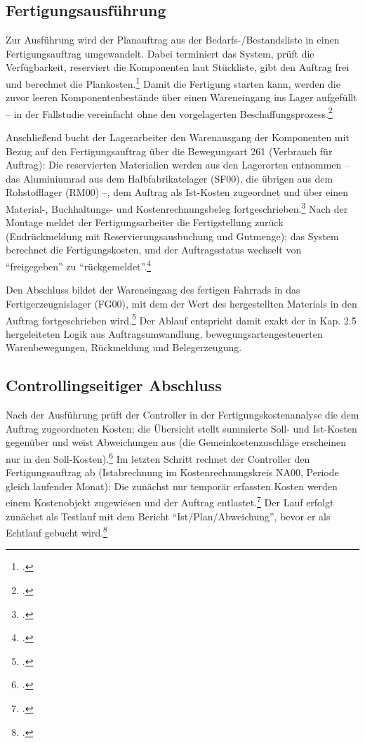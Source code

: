 \subsection{Fertigungsausführung}
Zur Ausführung wird der Planauftrag aus der Bedarfs-/Bestandsliste in einen Fertigungsauftrag umgewandelt. Dabei terminiert das System, prüft die Verfügbarkeit, reserviert die Komponenten laut Stückliste, gibt den Auftrag frei und berechnet die Plankosten.\footcite[Vgl.][S. 28 f.]{Boldau.2023} Damit die Fertigung starten kann, werden die zuvor leeren Komponentenbestände über einen Wareneingang ins Lager aufgefüllt -- in der Fallstudie vereinfacht ohne den vorgelagerten Beschaffungsprozess.\footcite[Vgl.][S. 31]{Boldau.2023}

Anschließend bucht der Lagerarbeiter den Warenausgang der Komponenten mit Bezug auf den Fertigungsauftrag über die Bewegungsart 261 (Verbrauch für Auftrag): Die reservierten Materialien werden aus den Lagerorten entnommen -- das Aluminiumrad aus dem Halbfabrikatelager (SF00), die übrigen aus dem Rohstofflager (RM00) --, dem Auftrag als Ist-Kosten zugeordnet und über einen Material-, Buchhaltungs- und Kostenrechnungsbeleg fortgeschrieben.\footcite[Vgl.][S. 34 f.]{Boldau.2023} Nach der Montage meldet der Fertigungsarbeiter die Fertigstellung zurück (Endrückmeldung mit Reservierungsausbuchung und Gutmenge); das System berechnet die Fertigungskosten, und der Auftragsstatus wechselt von \enquote{freigegeben} zu \enquote{rückgemeldet}.\footcite[Vgl.][S. 40 ff.]{Boldau.2023}

Den Abschluss bildet der Wareneingang des fertigen Fahrrads in das Fertigerzeugnislager (FG00), mit dem der Wert des hergestellten Materials in den Auftrag fortgeschrieben wird.\footcite[Vgl.][S. 44 f.]{Boldau.2023} Der Ablauf entspricht damit exakt der in Kap. 2.5 hergeleiteten Logik aus Auftragsumwandlung, bewegungsartengesteuerten Warenbewegungen, Rückmeldung und Belegerzeugung.

\subsection{Controllingseitiger Abschluss}
Nach der Ausführung prüft der Controller in der Fertigungskostenanalyse die dem Auftrag zugeordneten Kosten; die Übersicht stellt summierte Soll- und Ist-Kosten gegenüber und weist Abweichungen aus (die Gemeinkostenzuschläge erscheinen nur in den Soll-Kosten).\footcite[Vgl.][S. 46 f.]{Boldau.2023} Im letzten Schritt rechnet der Controller den Fertigungsauftrag ab (Istabrechnung im Kostenrechnungskreis NA00, Periode gleich laufender Monat): Die zunächst nur temporär erfassten Kosten werden einem Kostenobjekt zugewiesen und der Auftrag entlastet.\footcite[Vgl.][S. 48]{Boldau.2023} Der Lauf erfolgt zunächst als Testlauf mit dem Bericht \enquote{Ist/Plan/Abweichung}, bevor er als Echtlauf gebucht wird.\footcite[Vgl.][S. 49 ff.]{Boldau.2023}


